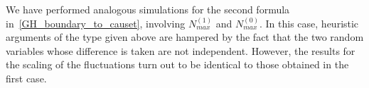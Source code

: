 \documentclass[12pt]{article}
\begin{document}
We have performed analogous simulations for the second formula in~\eqref{GH_boundary_to_causet}, involving $N^{(1)}_{max}$ and $N^{(0)}_{max}$. In this case, heuristic arguments of the type given above are hampered by the fact that the two random variables whose difference is taken are not independent. However, the results for the scaling of the fluctuations turn out to be identical to those obtained in the first case. 
\newpage




\end{document}
